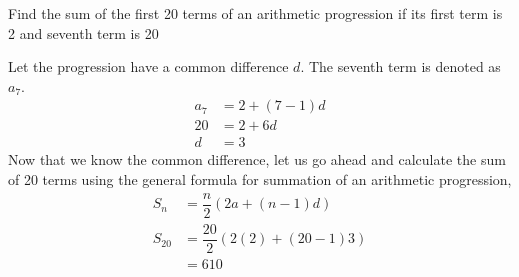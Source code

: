 
%
%
%
%
% 
% 

\question[4] Find the sum of the first 20 terms of an arithmetic progression 
if its first term is 2 and seventh term is 20


\ifprintanswers
\fi 

\begin{solution}[\halfpage]
  Let the progression have a common difference $d$. The seventh term is denoted as $a_7$.
  \begin{align}
    a_7 &= 2 + (7-1)d \\
    20  &= 2 + 6d \\
    d   &= 3 
  \end{align}
  Now that we know the common difference, let us go ahead and calculate the sum of 20 terms using the general formula for summation of an arithmetic progression,
  \begin{align}
    S_n    &= \dfrac{n}{2}(2a + (n-1)d) \\
    S_{20} &= \dfrac{20}{2}(2(2) + (20-1)3) \\
           &= 610
  \end{align}

\end{solution}

